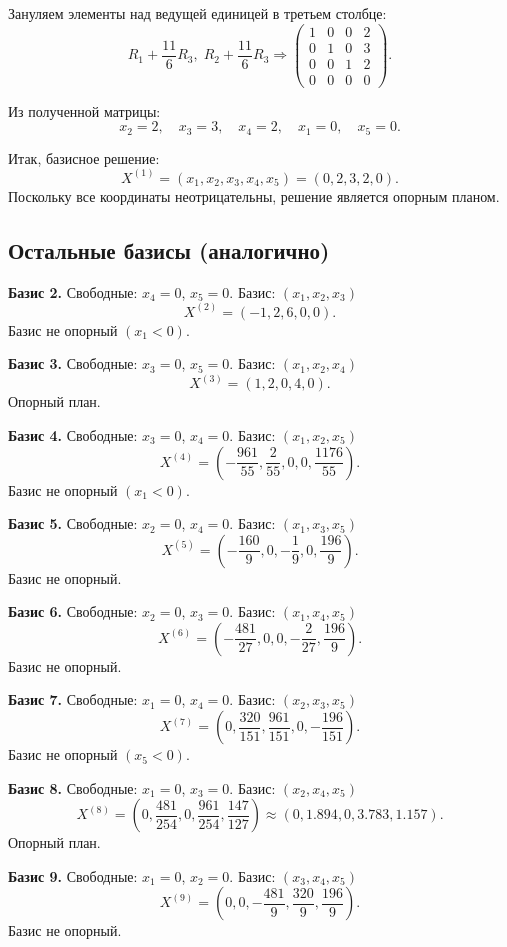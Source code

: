 \documentclass[a4paper,14pt]{extarticle}
\begin{document}
Зануляем элементы над ведущей единицей в третьем столбце:
\[
R_1+\frac{11}{6}R_3,\; R_2+\frac{11}{6}R_3\Rightarrow
\left(
\begin{array}{ccc|c}
1 & 0 & 0 & 2\\
0 & 1 & 0 & 3\\
0 & 0 & 1 & 2\\
0 & 0 & 0 & 0
\end{array}
\right).
\]

Из полученной матрицы:
\[
x_2=2,\quad x_3=3,\quad x_4=2,\quad x_1=0,\quad x_5=0.
\]

Итак, базисное решение:
\[
X^{(1)}=(x_1,x_2,x_3,x_4,x_5)=(0,2,3,2,0).
\]
Поскольку все координаты неотрицательны, решение является опорным планом.

\subsection*{Остальные базисы (аналогично)}

\textbf{Базис 2.} Свободные: \(x_4=0\), \(x_5=0\). Базис: \((x_1,x_2,x_3)\)
\[
X^{(2)}=(-1,2,6,0,0).
\]
Базис не опорный \((x_1<0)\).

\textbf{Базис 3.} Свободные: \(x_3=0\), \(x_5=0\). Базис: \((x_1,x_2,x_4)\)
\[
X^{(3)}=(1,2,0,4,0).
\]
Опорный план.

\textbf{Базис 4.} Свободные: \(x_3=0\), \(x_4=0\). Базис: \((x_1,x_2,x_5)\)
\[
X^{(4)}=\left(-\frac{961}{55},\frac{2}{55},0,0,\frac{1176}{55}\right).
\]
Базис не опорный \((x_1<0)\).

\textbf{Базис 5.} Свободные: \(x_2=0\), \(x_4=0\). Базис: \((x_1,x_3,x_5)\)
\[
X^{(5)}=\left(-\frac{160}{9},0,-\frac{1}{9},0,\frac{196}{9}\right).
\]
Базис не опорный.

\textbf{Базис 6.} Свободные: \(x_2=0\), \(x_3=0\). Базис: \((x_1,x_4,x_5)\)
\[
X^{(6)}=\left(-\frac{481}{27},0,0,-\frac{2}{27},\frac{196}{9}\right).
\]
Базис не опорный.

\textbf{Базис 7.} Свободные: \(x_1=0\), \(x_4=0\). Базис: \((x_2,x_3,x_5)\)
\[
X^{(7)}=\left(0,\frac{320}{151},\frac{961}{151},0,-\frac{196}{151}\right).
\]
Базис не опорный \((x_5<0)\).

\textbf{Базис 8.} Свободные: \(x_1=0\), \(x_3=0\). Базис: \((x_2,x_4,x_5)\)
\[
X^{(8)}=\left(0,\frac{481}{254},0,\frac{961}{254},\frac{147}{127}\right)
\approx (0,1.894,0,3.783,1.157).
\]
Опорный план.

\textbf{Базис 9.} Свободные: \(x_1=0\), \(x_2=0\). Базис: \((x_3,x_4,x_5)\)
\[
X^{(9)}=\left(0,0,-\frac{481}{9},\frac{320}{9},\frac{196}{9}\right).
\]
Базис не опорный.
\end{document}
